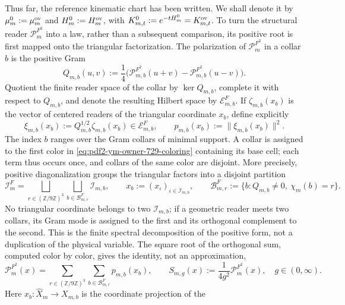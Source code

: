 Thus far, the reference kinematic chart has been written. We shall denote it by $\widehat\mu_m^0:=\widehat\mu_m^{\rm ov}$ and $\widehat H_m^0:=\widehat H_m^{\rm ov}$, with $\widehat K_{m,t}^0:=e^{-t\widehat H_m^0}=\widehat K_{m,t}^{\rm ov}$. To turn the structural reader $\mathcal P_m^{F^2}$ into a law, rather than a subsequent comparison, its positive root is first mapped onto the triangular factorization. The polarization of $\mathcal P_m^{F^2}$ in a collar $b$ is the positive Gram
\[
 Q_{m,b}(u,v):=\frac14\bigl(
 \mathcal P_{m,b}^{F^2}(u+v)-\mathcal P_{m,b}^{F^2}(u-v)
 \bigr).
\]
Quotient the finite reader space of the collar by $\ker Q_{m,b}$, complete it
with respect to $Q_{m,b}$, and denote the resulting Hilbert space by $\mathcal E_{m,b}^{F}$. If
$\zeta_{m,b}(x_b)$ is the vector of centered readers of the triangular coordinate
$x_b$, define explicitly
\begin{equation}\label{eq:pdf2-ym-action-root}
 \xi_{m,b}(x_b):=Q_{m,b}^{1/2}\zeta_{m,b}(x_b)
 \in\mathcal E_{m,b}^{F},
 \qquad
 p_{m,b}(x_b):=\|\xi_{m,b}(x_b)\|^2.
\end{equation}
The index $b$ ranges over the Gram collars of minimal support. A collar is assigned
to the first color in \eqref{eq:pdf2-ym-owner-729-coloring} containing its base cell;
each term thus occurs once, and collars of the same color are disjoint.
More precisely, positive diagonalization groups the triangular factors into
a disjoint partition
\begin{equation}\label{eq:pdf2-ym-action-factor-partition}
 \mathcal I_m^{F}
 =\bigsqcup_{r\in(\mathbb Z/9\mathbb Z)^3}
   \bigsqcup_{b\in\mathcal B_{m,r}^{F}}\mathcal I_{m,b},
 \qquad x_b:=(x_\iota)_{\iota\in\mathcal I_{m,b}},
 \qquad
 \mathcal B_{m,r}^{F}:=\{b:Q_{m,b}\ne0,\ \chi_m(b)=r\}.
\end{equation}
No triangular coordinate belongs to two $\mathcal I_{m,b}$; if a geometric
reader meets two collars, its Gram mode is assigned to the first and its orthogonal
complement to the second. This is the finite spectral decomposition of the positive form,
not a duplication of the physical variable.
The square root of the orthogonal sum, computed color by color, gives the identity, not an
approximation,
\begin{equation}\label{eq:pdf2-ym-action-reader-sum}
 \mathcal P_m^{F^2}(x)
 =\sum_{r\in(\mathbb Z/9\mathbb Z)^3}
   \sum_{b\in\mathcal B_{m,r}^{F}}p_{m,b}(x_b),
 \qquad
 S_{m,g}(x):=\frac1{4g^2}\mathcal P_m^{F^2}(x),
 \quad g\in(0,\infty).
\end{equation}
Here $x_b:\widehat X_m\to X_{m,b}$ is the coordinate projection of the
